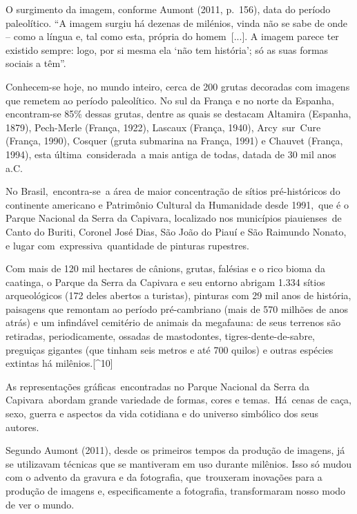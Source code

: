 \documentclass[
  letterpaper,
  a4paper,
  12pt]{scrbook}
\renewenvironment{quote}
  {\par\singlespacing\small\list{}{\rightmargin=0cm \leftmargin=4cm}%
   \item\relax}
  {\endlist}
\begin{document}
O surgimento da imagem, conforme Aumont (2011, p.~156), data do período
paleolítico. ``A imagem surgiu há dezenas de milénios, vinda não se sabe
de onde -- como a língua e, tal como esta, própria do homem~{[}...{]}. A
imagem parece ter existido sempre: logo, por si mesma ela `não tem
história'; só as suas formas sociais a têm''.~

Conhecem-se hoje, no mundo inteiro, cerca de 200 grutas decoradas com
imagens que remetem ao período paleolítico. No sul da França e no norte
da Espanha, encontram-se 85\% dessas grutas, dentre as quais se destacam
Altamira (Espanha, 1879), Pech-Merle (França, 1922), Lascaux (França,
1940), Arcy~sur~Cure (França, 1990), Cosquer (gruta submarina na França,
1991) e Chauvet (França, 1994), esta última~considerada~a mais antiga de
todas, datada de 30 mil anos a.C.

No Brasil,~encontra-se~a área de maior concentração de sítios
pré-históricos do continente americano e Patrimônio Cultural da
Humanidade desde 1991,~que é o Parque Nacional da Serra da Capivara,
localizado nos municípios piauienses~de Canto do Buriti, Coronel José
Dias, São João do Piauí e São Raimundo Nonato, e lugar
com~expressiva~quantidade de pinturas rupestres.~ ~

\begin{quote}
Com mais de 120 mil hectares de cânions, grutas, falésias e o rico bioma
da caatinga, o Parque da Serra da Capivara e seu entorno abrigam 1.334
sítios arqueológicos (172 deles abertos a turistas), pinturas com 29 mil
anos de história, paisagens que remontam ao período pré-cambriano (mais
de 570 milhões de anos atrás) e um infindável cemitério de animais da
megafauna: de seus terrenos são retiradas, periodicamente, ossadas de
mastodontes, tigres-dente-de-sabre, preguiças gigantes (que tinham seis
metros e até 700 quilos) e outras espécies extintas há
milênios.{[}\^{}10{]} ~
\end{quote}

As representações gráficas~encontradas no Parque Nacional da Serra da
Capivara~abordam grande variedade de formas, cores e temas.~Há~cenas de
caça, sexo, guerra e aspectos da vida cotidiana e do universo simbólico
dos seus autores.~

Segundo Aumont (2011), desde os primeiros tempos da produção de imagens,
já se utilizavam técnicas que se mantiveram em uso durante milênios.
Isso só mudou com o advento da gravura e da fotografia, que~trouxeram
inovações para a produção de imagens e, especificamente a fotografia,
transformaram nosso modo de ver o mundo.~
\end{document}
